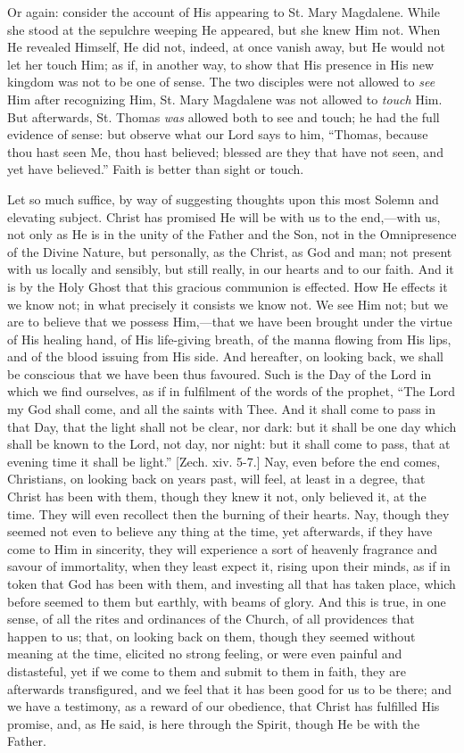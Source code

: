 Or again: consider the account of His appearing to St. Mary
Magdalene. While she stood at the sepulchre weeping He appeared, but she
knew Him not. When He revealed Himself, He did not, indeed, at once
vanish away, but He would not let her touch Him; as if, in another way,
to show that His presence in His new kingdom was not to be one of sense.
The two disciples were not allowed to \emph{see} Him after recognizing
Him, St. Mary Magdalene was not allowed to \emph{touch} Him. But
afterwards, St. Thomas \emph{was} allowed both to see and touch; he had
the full evidence of sense: but observe what our Lord says to him,
``Thomas, because thou hast seen Me, thou hast believed; blessed are
they that have not seen, and yet have believed.'' Faith is better
than sight or touch.

Let so much suffice, by way of suggesting thoughts upon this most
Solemn and elevating subject. Christ has promised He will be with us to
the end,—with us, not only as He is in the unity of the Father and the
Son, not in the Omnipresence of the Divine Nature, but personally, as
the Christ, as God and man; not present with us locally and sensibly,
but still really, in our hearts and to our faith. And it is by the Holy
Ghost that this gracious communion is effected. How He effects it we
know not; in what precisely it consists we know not. We see Him not; but
we are to believe that we possess Him,—that we have been brought under
the virtue of His healing hand, of His life-giving breath, of the manna
flowing from His lips, and of the blood issuing from His side. And
hereafter, on looking back, we shall be conscious that we have been thus
favoured. Such is the Day of the Lord in which we find ourselves, as if
in fulfilment of the words of the prophet, ``The Lord my God shall
come, and all the saints with Thee. And it shall come to pass in that
Day, that the light shall not be clear, nor dark: but it shall be one
day which shall be known to the Lord, not day, nor night: but it shall
come to pass, that at evening time it shall be light.'' [Zech. xiv.
5-7.] Nay, even before the end comes, Christians, on looking back on
years past, will feel, at least in a degree, that Christ has been with
them, though they knew it not, only believed it, at the time. They will
even recollect then the burning of their hearts. Nay, though they seemed
not even to believe any thing at the time, yet afterwards, if they have
come to Him in sincerity, they will experience a sort of heavenly fragrance
and savour of immortality, when they least expect it, rising upon their
minds, as if in token that God has been with them, and investing all
that has taken place, which before seemed to them but earthly, with
beams of glory. And this is true, in one sense, of all the rites and
ordinances of the Church, of all providences that happen to us; that, on
looking back on them, though they seemed without meaning at the time,
elicited no strong feeling, or were even painful and distasteful, yet if
we come to them and submit to them in faith, they are afterwards
transfigured, and we feel that it has been good for us to be there; and
we have a testimony, as a reward of our obedience, that Christ has
fulfilled His promise, and, as He said, is here through the Spirit,
though He be with the Father.

